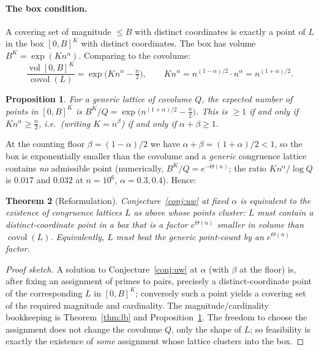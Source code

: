 \documentclass[11pt]{article}
\newtheorem{theorem}{Theorem}
\newtheorem{proposition}[theorem]{Proposition}
\theoremstyle{definition}
\begin{document}
\paragraph{The box condition.}
A covering set of magnitude $\le B$ with distinct coordinates is exactly a point of
$L$ in the box $[0,B]^K$ with distinct coordinates. The box has volume
$B^{K}=\exp(K n^{\alpha})$. Comparing to the covolume:
\[
\frac{\operatorname{vol}[0,B]^K}{\operatorname{covol}(L)}
=\exp\!\big(K n^{\alpha}-\tfrac{n}{2}\big),
\qquad
K n^{\alpha}=n^{(1-\alpha)/2}\cdot n^{\alpha}=n^{(1+\alpha)/2}.
\]

\begin{proposition}\label{prop:generic}
For a generic lattice of covolume $Q$, the expected number of points in $[0,B]^K$
is $B^K/Q=\exp\!\big(n^{(1+\alpha)/2}-\tfrac n2\big)$. This is
$\ge 1$ if and only if $K n^{\alpha}\ge \tfrac n2$, i.e.\ (writing $K=n^{\beta}$)
if and only if $\alpha+\beta\ge 1$.
\end{proposition}

At the counting floor $\beta=(1-\alpha)/2$ we have
$\alpha+\beta=(1+\alpha)/2<1$, so the box is exponentially smaller than the
covolume and a \emph{generic} congruence lattice contains \emph{no} admissible
point (numerically, $B^K/Q=e^{-\Theta(n)}$; the ratio $Kn^{\alpha}/\log Q$ is
$0.017$ and $0.032$ at $n=10^6$, $\alpha=0.3,0.4$). Hence:

\begin{theorem}[Reformulation]\label{thm:reform}
Conjecture~\ref{conj:uw} at fixed $\alpha$ is equivalent to the existence of
congruence lattices $L$ as above whose points \emph{cluster}: $L$ must contain a
distinct-coordinate point in a box that is a factor $e^{\Theta(n)}$ smaller in
volume than $\operatorname{covol}(L)$. Equivalently, $L$ must beat the generic
point-count by an $e^{\Theta(n)}$ factor.
\end{theorem}

\begin{proof}[Proof sketch]
A solution to Conjecture~\ref{conj:uw} at $\alpha$ (with $\beta$ at the floor) is,
after fixing an assignment of primes to pairs, precisely a distinct-coordinate
point of the corresponding $L$ in $[0,B]^K$; conversely such a point yields a
covering set of the required magnitude and cardinality. The magnitude/cardinality
bookkeeping is Theorem~\ref{thm:lb} and Proposition~\ref{prop:generic}. The freedom
to choose the assignment does not change the covolume $Q$, only the shape of $L$;
so feasibility is exactly the existence of \emph{some} assignment whose lattice
clusters into the box.
\end{proof}
\end{document}
